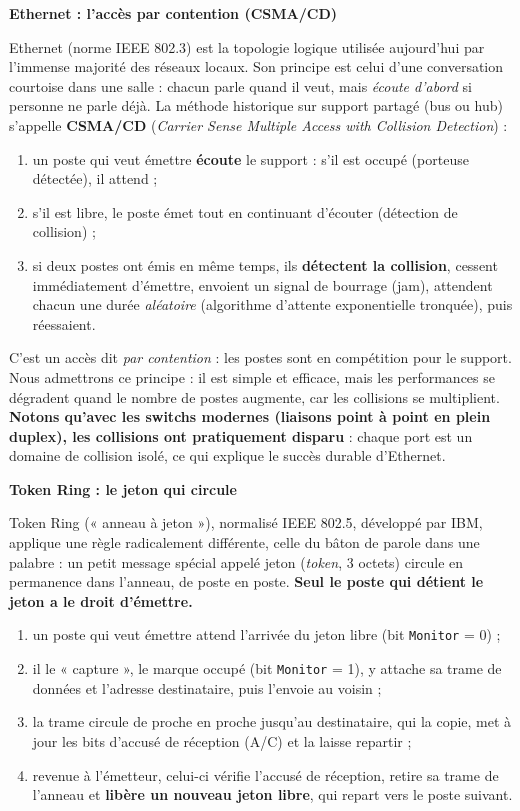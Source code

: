 \documentclass[11pt]{article}
\newcommand{\cle}[1]{{\popxbold\color{popdark}#1}}
\begin{document}
\textbf{Ethernet : l'accès par contention (CSMA/CD)}\par
\cle{Ethernet} (norme IEEE 802.3) est la topologie logique utilisée aujourd'hui par l'immense majorité des réseaux locaux. Son principe est celui d'une conversation courtoise dans une salle : chacun parle quand il veut, mais \emph{écoute d'abord} si personne ne parle déjà. La méthode historique sur support partagé (bus ou hub) s'appelle \textbf{CSMA/CD} (\emph{Carrier Sense Multiple Access with Collision Detection}) :

\begin{enumerate}
\item un poste qui veut émettre \textbf{écoute} le support : s'il est occupé (porteuse détectée), il attend ;
\item s'il est libre, le poste émet tout en continuant d'écouter (détection de collision) ;
\item si deux postes ont émis en même temps, ils \textbf{détectent la collision}, cessent immédiatement d'émettre, envoient un signal de bourrage (jam), attendent chacun une durée \emph{aléatoire} (algorithme d'attente exponentielle tronquée), puis réessaient.
\end{enumerate}

C'est un accès dit \emph{par contention} : les postes sont en compétition pour le support. Nous admettrons ce principe : il est simple et efficace, mais les performances se dégradent quand le nombre de postes augmente, car les collisions se multiplient. \textbf{Notons qu'avec les switchs modernes (liaisons point à point en plein duplex), les collisions ont pratiquement disparu} : chaque port est un domaine de collision isolé, ce qui explique le succès durable d'Ethernet.

\textbf{Token Ring : le jeton qui circule}\par
\cle{Token Ring} (« anneau à jeton »), normalisé IEEE 802.5, développé par IBM, applique une règle radicalement différente, celle du bâton de parole dans une palabre : un petit message spécial appelé \cle{jeton} (\emph{token}, 3 octets) circule en permanence dans l'anneau, de poste en poste. \textbf{Seul le poste qui détient le jeton a le droit d'émettre.}

\begin{enumerate}
\item un poste qui veut émettre attend l'arrivée du jeton libre (bit \texttt{Monitor} = 0) ;
\item il le « capture », le marque occupé (bit \texttt{Monitor} = 1), y attache sa trame de données et l'adresse destinataire, puis l'envoie au voisin ;
\item la trame circule de proche en proche jusqu'au destinataire, qui la copie, met à jour les bits d'accusé de réception (A/C) et la laisse repartir ;
\item revenue à l'émetteur, celui-ci vérifie l'accusé de réception, retire sa trame de l'anneau et \textbf{libère un nouveau jeton libre}, qui repart vers le poste suivant.
\end{enumerate}
\end{document}
